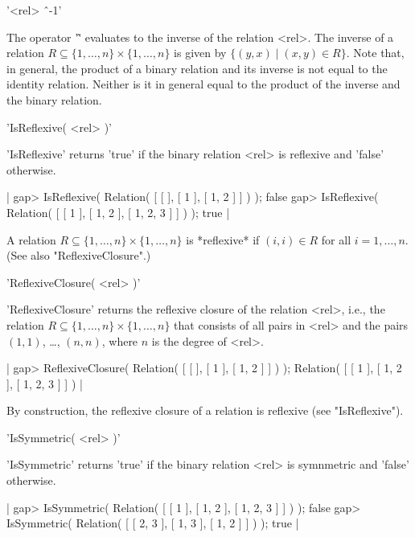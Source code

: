 \vspace{5mm}
'<rel> \^\ -1'%

The operator '\^' evaluates to  the inverse of  the relation <rel>.   The
inverse of a relation  $R \subseteq \{1, \dots,   n\} \times \{1,  \dots,
n\}$ is given by $\{(y, x) \mid (x, y) \in  R\}$.  Note that, in general,
the product of a   binary relation and its inverse   is not equal to  the
identity relation.  Neither is it in general  equal to the product of the
inverse and the binary relation.

%

'IsReflexive( <rel> )'

'IsReflexive' returns  'true' if the  binary  relation <rel> is reflexive
and 'false' otherwise.

|    gap> IsReflexive( Relation( [ [ ], [ 1 ], [ 1, 2 ] ] ) );
    false
    gap> IsReflexive( Relation( [ [ 1 ], [ 1, 2 ], [ 1, 2, 3 ] ] ) );
    true |
    
A  relation  $R \subseteq  \{1, \dots,  n\}  \times  \{1, \dots,  n\}$ is
*reflexive* if  $(i, i)  \in  R$ for all  $i =  1, \dots,  n$.  (See also
"ReflexiveClosure".)


'ReflexiveClosure( <rel> )'

'ReflexiveClosure' returns the  reflexive closure of  the relation <rel>,
i.e., the relation  $R \subseteq \{1,  \dots, n\} \times \{1, \dots, n\}$
that consists of all pairs  in <rel> and the pairs  $(1, 1)$, \dots, $(n,
n)$, where $n$ is the degree of <rel>.

|    gap> ReflexiveClosure( Relation( [ [ ], [ 1 ], [ 1, 2 ] ] ) );   
    Relation( [ [ 1 ], [ 1, 2 ], [ 1, 2, 3 ] ] ) |

By construction,  the reflexive closure of  a relation is  reflexive (see
"IsReflexive").

%

'IsSymmetric( <rel> )'

'IsSymmetric' returns  'true' if the binary  relation <rel> is symnmetric
and 'false' otherwise.

|    gap> IsSymmetric( Relation( [ [ 1 ], [ 1, 2 ], [ 1, 2, 3 ] ] ) );
    false
    gap> IsSymmetric( Relation( [ [ 2, 3 ], [ 1, 3 ], [ 1, 2 ] ] ) );
    true |

